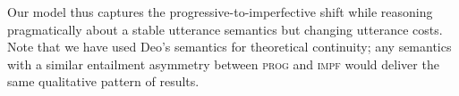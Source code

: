 \documentclass[12pt]{article}
\newcommand{\gcs}[1]{\textcolor{blue}{[gcs: #1]}}
\newcommand{\gnl}[1]{\textcolor{red}{[gnl: #1]}}
\begin{document}
Our model thus captures the progressive-to-imperfective shift while reasoning pragmatically about a stable utterance semantics but changing utterance costs. Note that we have used Deo's semantics for theoretical continuity; any semantics with a similar entailment asymmetry between \textsc{prog} and \textsc{impf} would deliver the same qualitative pattern of results.






\end{document}
